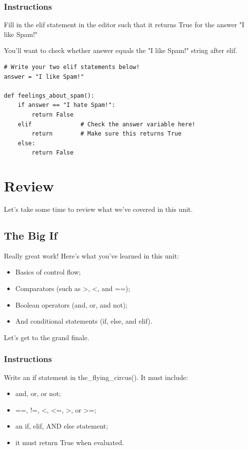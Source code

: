 \documentclass[12pt,a4paper,final,twoside,onecolumn,titlepage]{book}
\begin{document}
\subsubsection{Instructions}

Fill in the elif statement in the editor such that it returns True for the answer "I like Spam!"

You'll want to check whether answer equals the "I like Spam!" string after elif.
\begin{lstlisting}
# Write your two elif statements below!
answer = "I like Spam!"

def feelings_about_spam():
    if answer == "I hate Spam!":
        return False
    elif              # Check the answer variable here!
        return        # Make sure this returns True
    else:
        return False
\end{lstlisting}

\section{Review}
Let's take some time to review what we've covered in this unit.
\subsection{The Big If}

Really great work! Here's what you've learned in this unit:
\begin{itemize}
\item Basics of control flow;
\item Comparators (such as >, <, and ==);
\item Boolean operators (and, or, and not);
\item And conditional statements (if, else, and elif).
\end{itemize}

Let's get to the grand finale.
\subsubsection{Instructions}

Write an if statement in the\_flying\_circus(). It must include:
\begin{itemize}
\item and, or, or not;
\item ==, !=, <, <=, >, or >=;
\item an if, elif, AND else statement;
\item it must return True when evaluated.
\end{itemize}
\end{document}
